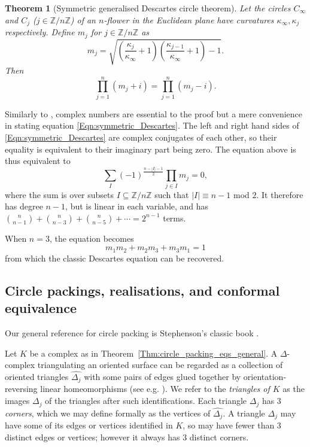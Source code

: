 \documentclass[12pt]{amsart}
\numberwithin{equation}{section}
\newtheorem{theorem}[equation]{Theorem}
\theoremstyle{named}
\newcommand{\refeqn}[1]{\eqref{Eqn:#1}}
\newcommand{\refthm}[1]{Theorem~\ref{Thm:#1}}
\newcommand{\Z}{\mathbb{Z}}
\begin{document}
\begin{theorem}[Symmetric generalised Descartes circle theorem]
\label{Thm:gen_Descartes}
Let the circles $C_\infty$ and $C_j$ ($j \in \Z/n\Z$) of an $n$-flower in the Euclidean plane have curvatures $\kappa_\infty, \kappa_j$ respectively. Define $m_j$ for $j \in \Z/n\Z$ as
\begin{equation}
\label{Eqn:mj_def}
m_j = \sqrt{ \left( \frac{\kappa_j}{\kappa_\infty} + 1 \right) \left( \frac{\kappa_{j-1}}{\kappa_\infty} + 1 \right) - 1}.
\end{equation}
Then 
\begin{equation}
\label{Eqn:symmetric_Descartes}
\prod_{j=1}^n \left( m_j + i \right) = \prod_{j=1}^n \left( m_j - i \right).
\end{equation}
\end{theorem}
Similarly to \cite{MZ25}, complex numbers are essential to the proof but a mere convenience in stating equation \refeqn{symmetric_Descartes}. The left and right hand sides of \refeqn{symmetric_Descartes} are complex conjugates of each other, so their equality is equivalent to their imaginary part being zero. The equation above is thus equivalent to
\begin{equation}
\label{Eqn:vertex_eqn}
\sum_{I} (-1)^{\frac{ n-|I|-1 }{2} } \prod_{j \in I} m_{j} = 0,
\end{equation}
where the sum is over subsets $I \subseteq \Z/n\Z$ such that $|I| \equiv n-1$ mod $2$. It therefore has degree $n-1$, but is linear in each variable, and has $\binom{n}{n-1} + \binom{n}{n-3} + \binom{n}{n-5} + \cdots = 2^{n-1}$ terms.

When $n=3$, the equation becomes
\[
m_1 m_2 + m_2 m_3 + m_3 m_1 = 1
\]
from which the classic Descartes equation can be recovered.



\subsection{Circle packings, realisations, and conformal equivalence}
\label{Sec:realisations_equivalence}

Our general reference for circle packing is Stephenson's classic book \cite{StephensonKenneth2005Itcp}.

Let $K$ be a complex as in \refthm{circle_packing_eqs_general}.
 A $\Delta$-complex triangulating an oriented surface can be regarded as a collection of oriented triangles $\widehat{\Delta_j}$ with some pairs of edges glued together by orientation-reversing linear homeomorphisms (see e.g. \cite{Hatcher_text}). We refer to the \emph{triangles of $K$} as the images $\Delta_j$ of the triangles after such identifications. Each triangle $\Delta_j$ has 3 \emph{corners}, which we may define formally as the vertices of $\widehat{\Delta_j}$. A triangle $\Delta_j$ may have some of its edges or vertices identified in $K$, so may have fewer than 3 distinct edges or vertices; however it always has 3 distinct corners.
\end{document}
